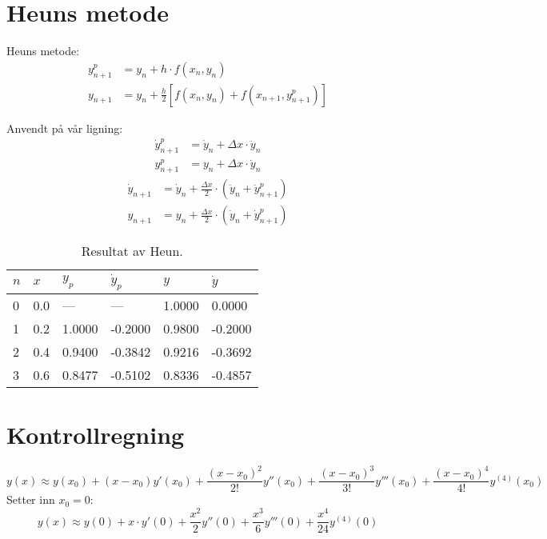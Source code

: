 \clearpage



\section{Heuns metode} %
\label{sec:heuns_metode}
Heuns metode:
\begin{align}
  y_{n+1}^p &=  y_n + h \cdot f(x_n,y_n) \\
  y_{n+1}   &=  y_n + \frac{h}{2} \left[f(x_n,y_n)+f(x_{n+1},y_{n+1}^p)\right]
\end{align}

Anvendt på vår ligning:
\begin{align}
  \dot y_{n+1}^p  &= \dot y_n + \Delta x \cdot \ddot y_n \\
  y_{n+1}^p       &= y_n  + \Delta x \cdot \dot y_n
\end{align}
\begin{align}
  \dot y_{n+1}  &= \dot y_n + \frac{\Delta x}{2} \cdot \left(\ddot y_n + \ddot y_{n+1}^p \right) \\
  y_{n+1}       &= y_n  + \frac{\Delta x}{2} \cdot (\dot y_n + \dot y_{n+1}^p)
\end{align}


\begin{table}[H]
  \centering
  \caption{Resultat av Heun.}
  \label{tab:heun}
  \begin{tabularx}{0.7\textwidth}{XXXXXX}
    \toprule
    $n$  & $x$  & $y_p$  & $\dot y_p$ & $y$    & $\dot y$ \\
    \midrule
    0    & 0.0  & ---    & ---        & 1.0000 &  0.0000 \\
    1    & 0.2  & 1.0000 & -0.2000    & 0.9800 & -0.2000 \\
    2    & 0.4  & 0.9400 & -0.3842    & 0.9216 & -0.3692 \\
    3    & 0.6  & 0.8477 & -0.5102    & 0.8336 & -0.4857 \\
    \bottomrule
  \end{tabularx}
\end{table}



\clearpage
\section{Kontrollregning} %
\label{sec:kontrollregning}

\begin{equation}
  y(x) \approx y(x_0) + (x-x_0) y'(x_0) + \frac{(x-x_0)^2}{2!}y''(x_0)
       + \frac{(x-x_0)^3}{3!} y'''(x_0) + \frac{(x-x_0)^4}{4!} y^{(4)}(x_0)
\end{equation}
Setter inn $x_0 = 0$:
\begin{equation}
  y(x) \approx y(0) + x \cdot y'(0) + \frac{x^2}{2}y''(0)
       + \frac{x^3}{6} y'''(0) + \frac{x^4}{24} y^{(4)}(0)
\end{equation}

